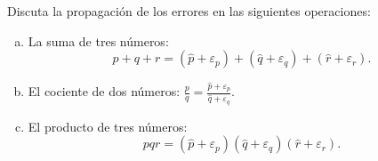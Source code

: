 \begin{enunciado}
 Discuta la propagaci\'on de los errores en las siguientes operaciones:
 \begin{enumerate}[(a)]
  \item La suma de tres n\'umeros:
  \begin{equation*}
   p + q +r = \left( \widehat{p} + \varepsilon_p \right) + \left( \widehat{q} + \varepsilon_q \right) + \left( \widehat{r} + \varepsilon_r \right).
  \end{equation*}

  \item El cociente de dos n\'umeros: $\displaystyle{ \frac{p}{q} = \frac{\widehat{p} + \varepsilon_p}{\widehat{q} + \varepsilon_q} }$.

  \item El producto de tres n\'umeros:
  \begin{equation*}
   pqr = \left( \widehat{p} + \varepsilon_p \right)\left( \widehat{q} + \varepsilon_q \right)\left( \widehat{r} + \varepsilon_r \right).
  \end{equation*}
 \end{enumerate}
\end{enunciado}

\begin{solucion}
 
\end{solucion}
